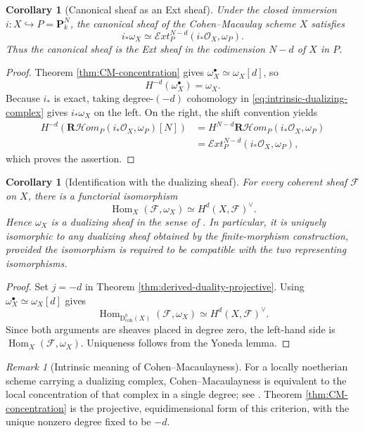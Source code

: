 \documentclass[11pt,a4paper]{article}
\newtheorem{corollary}[theorem]{Corollary}
\theoremstyle{definition}
\theoremstyle{remark}
\newtheorem{remark}[theorem]{Remark}
\newcommand{\OO}{\mathcal O}
\newcommand{\FF}{\mathcal F}
\newcommand{\PP}{\mathbf P}
\newcommand{\Hom}{\operatorname{Hom}}
\newcommand{\shExt}{\mathcal E\!xt}
\newcommand{\RshHom}{\mathbf R\!\mathcal H\!om}
\newcommand{\Dbcoh}{\mathrm D^b_{\mathrm{coh}}}
\newcommand{\dual}{^{\vee}}
\begin{document}
\begin{corollary}[Canonical sheaf as an Ext sheaf]
\label{cor:canonical-sheaf-ext}
Under the closed immersion $i:X\hookrightarrow P=\PP_k^N$, the canonical
sheaf of the Cohen--Macaulay scheme $X$ satisfies
\[
  i_*\omega_X
  \simeq
  \shExt_P^{N-d}(i_*\OO_X,\omega_P).
\]
Thus the canonical sheaf is the Ext sheaf in the codimension
$N-d$ of $X$ in $P$.
\end{corollary}

\begin{proof}
Theorem \ref{thm:CM-concentration} gives
$\omega_X^\bullet\simeq\omega_X[d]$, so
\[
  H^{-d}(\omega_X^\bullet)=\omega_X.
\]
Because $i_*$ is exact, taking degree-$(-d)$ cohomology in
\eqref{eq:intrinsic-dualizing-complex} gives $i_*\omega_X$ on the left. On
the right, the shift convention yields
\begin{align*}
  H^{-d}\!\left(
    \RshHom_P(i_*\OO_X,\omega_P)[N]
  \right)
  &=H^{N-d}\RshHom_P(i_*\OO_X,\omega_P)\\
  &=\shExt_P^{N-d}(i_*\OO_X,\omega_P),
\end{align*}
which proves the assertion.
\end{proof}

\begin{corollary}[Identification with the dualizing sheaf]
\label{cor:hartshorne-dualizing-sheaf}
For every coherent sheaf $\FF$ on $X$, there is a functorial isomorphism
\begin{equation}\label{eq:top-duality}
  \Hom_X(\FF,\omega_X)
  \simeq H^d(X,\FF)\dual.
\end{equation}
Hence $\omega_X$ is a dualizing sheaf in the sense of
\cite[Chapter III, Definition preceding Proposition 7.2]{HartshorneAG}.
In particular, it is uniquely isomorphic to any dualizing sheaf obtained by
the finite-morphism construction, provided the isomorphism is required to be
compatible with the two representing isomorphisms.
\end{corollary}

\begin{proof}
Set $j=-d$ in Theorem \ref{thm:derived-duality-projective}.  Using
$\omega_X^\bullet\simeq\omega_X[d]$ gives
\[
  \Hom_{\Dbcoh(X)}(\FF,\omega_X)
  \simeq H^d(X,\FF)\dual.
\]
Since both arguments are sheaves placed in degree zero, the left-hand side is
$\Hom_X(\FF,\omega_X)$.  Uniqueness follows from the Yoneda lemma.
\end{proof}

\begin{remark}[Intrinsic meaning of Cohen--Macaulayness]
For a locally noetherian scheme carrying a dualizing complex,
Cohen--Macaulayness is equivalent to the local concentration of that complex
in a single degree; see \cite[Tag 0AWT]{Stacks}.  Theorem
\ref{thm:CM-concentration} is the projective, equidimensional form of this
criterion, with the unique nonzero degree fixed to be $-d$.
\end{remark}
\end{document}
